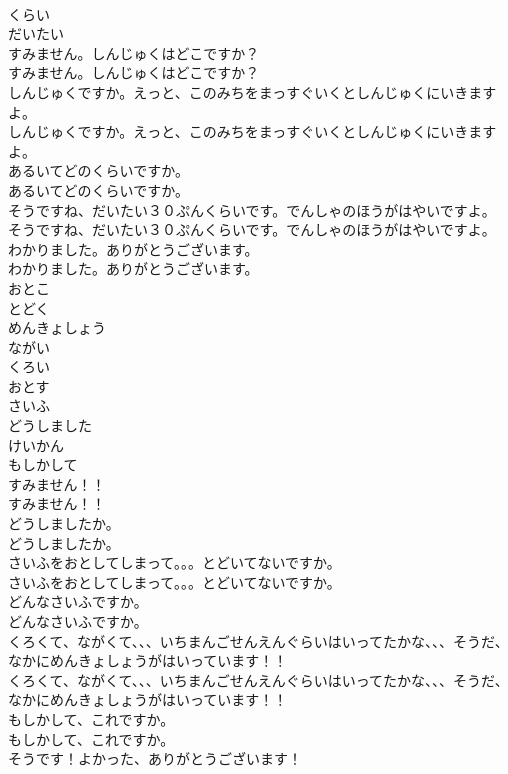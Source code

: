 \documentclass[8pt]{extreport}
\begin{document}
\begin{CJK}{UTF8}{min}
\\	くらい
\\	だいたい
\\	すみません。しんじゅくはどこですか？
\\	すみません。しんじゅくはどこですか？
\\	しんじゅくですか。えっと、このみちをまっすぐいくとしんじゅくにいきますよ。
\\	しんじゅくですか。えっと、このみちをまっすぐいくとしんじゅくにいきますよ。
\\	あるいてどのくらいですか。
\\	あるいてどのくらいですか。
\\	そうですね、だいたい３０ぷんくらいです。でんしゃのほうがはやいですよ。
\\	そうですね、だいたい３０ぷんくらいです。でんしゃのほうがはやいですよ。
\\	わかりました。ありがとうございます。
\\	わかりました。ありがとうございます。
\\	おとこ
\\	とどく
\\	めんきょしょう
\\	ながい
\\	くろい
\\	おとす
\\	さいふ
\\	どうしました
\\	けいかん
\\	もしかして
\\	すみません！！
\\	すみません！！
\\	どうしましたか。
\\	どうしましたか。
\\	さいふをおとしてしまって。。。とどいてないですか。
\\	さいふをおとしてしまって。。。とどいてないですか。
\\	どんなさいふですか。
\\	どんなさいふですか。
\\	くろくて、ながくて、、、いちまんごせんえんぐらいはいってたかな、、、そうだ、なかにめんきょしょうがはいっています！！
\\	くろくて、ながくて、、、いちまんごせんえんぐらいはいってたかな、、、そうだ、なかにめんきょしょうがはいっています！！
\\	もしかして、これですか。
\\	もしかして、これですか。
\\	そうです！よかった、ありがとうございます！

\end{CJK}
\end{document}
